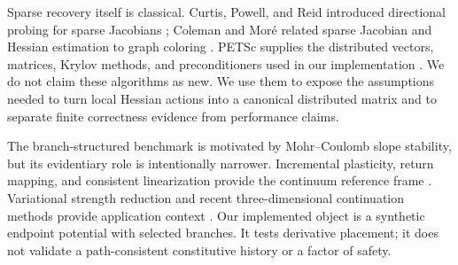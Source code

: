 Sparse recovery itself is classical. Curtis, Powell, and Reid introduced
directional probing for sparse Jacobians \citep{curtis1974sparsejacobian};
Coleman and Mor{\'e} related sparse Jacobian and Hessian estimation to graph
coloring \citep{coleman1983sparsejacobian,coleman1984sparsehessian}. PETSc
supplies the distributed vectors, matrices, Krylov methods, and preconditioners
used in our implementation \citep{balay1997petsc,petsc2026manual}. We do not
claim these algorithms as new. We use them to expose the assumptions needed to
turn local Hessian actions into a canonical distributed matrix and to separate
finite correctness evidence from performance claims.

The branch-structured benchmark is motivated by Mohr--Coulomb slope stability,
but its evidentiary role is intentionally narrower. Incremental plasticity,
return mapping, and consistent linearization provide the continuum reference
frame \citep{simo1985consistent,simo1998compinel,sysala2017returnmapping}.
Variational strength reduction and recent three-dimensional continuation
methods provide application context
\citep{sysala2021optimization,sysala2025advancedcontinuation}. Our implemented
object is a synthetic endpoint potential with selected branches. It tests
derivative placement; it does not validate a path-consistent constitutive
history or a factor of safety.
